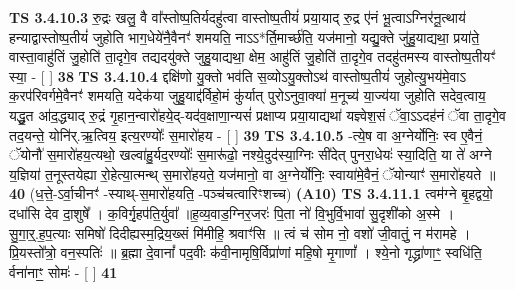 \documentclass[17pt]{extarticle}
\begin{document}
                  \newline
                                \textbf{ TS 3.4.10.3} \newline
                  रु॒द्रः खलु॒ वै वा᳚स्तोष्प॒तिर्यदहु॑त्वा वास्तोष्प॒तीयं॑ प्रया॒याद् रु॒द्र ए॑नं भू॒त्वाऽग्निर॑नू॒त्थाय॑ हन्याद्वास्तोष्प॒तीयं॑ जुहोति भाग॒धेये॑नै॒वैनꣳ॑ शमयति॒ नाऽऽ*र्ति॒मार्च्छ॑ति॒ यज॑मानो॒ यद्यु॒क्ते जु॑हु॒याद्यथा॒ प्रया॑ते॒ वास्ता॒वाहु॑तिं जु॒होति॑ ता॒दृगे॒व तद्यदयु॑क्ते जुहु॒याद्यथा॒ क्षेम॒ आहु॑तिं जु॒होति॑ ता॒दृगे॒व तदहु॑तमस्य वास्तोष्प॒तीयꣳ॑ स्या॒ - [  ] \textbf{  38} \newline
                  \newline
                                \textbf{ TS 3.4.10.4} \newline
                  द्दक्षि॑णो यु॒क्तो भव॑ति स॒व्योऽयु॒क्तोऽथ॑ वास्तोष्प॒तीयं॑ जुहोत्यु॒भय॑मे॒वाऽ क॒रप॑रिवर्गमे॒वैनꣳ॑ शमयति॒ यदेक॑या जुहु॒याद्द॑र्विहो॒मं कु॑र्यात् पुरोऽनुवा॒क्या॑ म॒नूच्य॑ या॒ज्य॑या जुहोति सदेव॒त्वाय॒ यद्धु॒त आ॑द॒द्ध्याद् रु॒द्रं गृ॒हान॒न्वारो॑हये॒द्-यद॑व॒क्षाणा॒न्यसं॑ प्रक्षाप्य प्रया॒याद्यथा॑ यज्ञ्वेश॒सं ॅवा॒ऽऽदह॑नं ॅवा ता॒दृगे॒व तद॒यन्ते॒ योनि॑र्.ऋ॒त्विय॒ इत्य॒रण्योः᳚ स॒मारो॑हय - [  ] \textbf{  39} \newline
                  \newline
                                \textbf{ TS 3.4.10.5} \newline
                  -त्ये॒ष वा अ॒ग्नेर्योनिः॒ स्व ए॒वैनं॒ ॅयोनौ॑ स॒मारो॑हय॒त्यथो॒ खल्वा॑हु॒र्यद॒रण्योः᳚ स॒मारू॑ढो॒ नश्ये॒दुद॑स्या॒ग्निः सी॑देत् पुनरा॒धेयः॑ स्या॒दिति॒ या ते॑ अग्ने य॒ज्ञिया॑ त॒नूस्तयेह्या रो॒हेत्या॒त्मन्थ् स॒मारो॑हयते॒ यज॑मानो॒ वा अ॒ग्नेर्योनिः॒ स्वाया॑मे॒वैनं॒ ॅयोन्याꣳ॑ स॒मारो॑हयते ॥ \textbf{  40} \newline
                  \newline
                      (ध॒त्ते॒-ऽर्वा॒चीनꣳ॑ -स्याथ्-स॒मारो॑हयति॒ -पञ्च॑चत्वारिꣳशच्च)  \textbf{(A10)} \newline \newline
                                        \textbf{ TS 3.4.11.1} \newline
                  त्वम॑ग्ने बृ॒हद्वयो॒ दधा॑सि देव दा॒शुषे᳚ । क॒विर्गृ॒हप॑ति॒र्युवा᳚ ॥ह॒व्य॒वाड॒ग्निर॒जरः॑ पि॒ता नो॑ वि॒भुर्वि॒भावा॑ सु॒दृशी॑को अ॒स्मे । सु॒गा॒र्॒.ह॒प॒त्याः समिषो॑ दिदीह्यस्म॒द्रिय॒ख्सं मि॑मीहि॒ श्रवाꣳ॑सि ॥ त्वं च॑ सोम नो॒ वशो॑ जी॒वातुं॒ न म॑रामहे । प्रि॒यस्तो᳚त्रो॒ वन॒स्पतिः॑ ॥ ब्र॒ह्मा दे॒वानां᳚ पद॒वीः क॑वी॒नामृषि॒र्विप्रा॑णां महि॒षो मृ॒गाणां᳚ । श्ये॒नो गृद्ध्रा॑णाꣳ॒॒ स्वधि॑ति॒ र्वना॑नाꣳ॒॒ सोमः॑ - [  ] \textbf{  41} \newline
\end{document}
